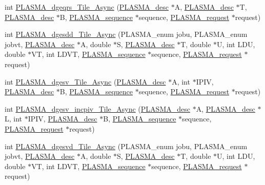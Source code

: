 \begin{DoxyCompactItemize}
\item 
int \hyperlink{group__double__Tile__Async_gad81f46c405c0b4fed0067a2d7928847a_gad81f46c405c0b4fed0067a2d7928847a}{P\+L\+A\+S\+M\+A\+\_\+dgeqrs\+\_\+\+Tile\+\_\+\+Async} (\hyperlink{structplasma__desc__t}{P\+L\+A\+S\+M\+A\+\_\+desc} $\ast$A, \hyperlink{structplasma__desc__t}{P\+L\+A\+S\+M\+A\+\_\+desc} $\ast$T, \hyperlink{structplasma__desc__t}{P\+L\+A\+S\+M\+A\+\_\+desc} $\ast$B, \hyperlink{structplasma__sequence__t}{P\+L\+A\+S\+M\+A\+\_\+sequence} $\ast$sequence, \hyperlink{structplasma__request__t}{P\+L\+A\+S\+M\+A\+\_\+request} $\ast$request)
\item 
int \hyperlink{group__double__Tile__Async_ga2b337c099140ae747db7a7ca9a842550_ga2b337c099140ae747db7a7ca9a842550}{P\+L\+A\+S\+M\+A\+\_\+dgesdd\+\_\+\+Tile\+\_\+\+Async} (P\+L\+A\+S\+M\+A\+\_\+enum jobu, P\+L\+A\+S\+M\+A\+\_\+enum jobvt, \hyperlink{structplasma__desc__t}{P\+L\+A\+S\+M\+A\+\_\+desc} $\ast$A, double $\ast$S, \hyperlink{structplasma__desc__t}{P\+L\+A\+S\+M\+A\+\_\+desc} $\ast$T, double $\ast$U, int L\+D\+U, double $\ast$V\+T, int L\+D\+V\+T, \hyperlink{structplasma__sequence__t}{P\+L\+A\+S\+M\+A\+\_\+sequence} $\ast$sequence, \hyperlink{structplasma__request__t}{P\+L\+A\+S\+M\+A\+\_\+request} $\ast$request)
\item 
int \hyperlink{group__double__Tile__Async_ga1a8cc58569c097961b0838a5561479e7_ga1a8cc58569c097961b0838a5561479e7}{P\+L\+A\+S\+M\+A\+\_\+dgesv\+\_\+\+Tile\+\_\+\+Async} (\hyperlink{structplasma__desc__t}{P\+L\+A\+S\+M\+A\+\_\+desc} $\ast$A, int $\ast$I\+P\+I\+V, \hyperlink{structplasma__desc__t}{P\+L\+A\+S\+M\+A\+\_\+desc} $\ast$B, \hyperlink{structplasma__sequence__t}{P\+L\+A\+S\+M\+A\+\_\+sequence} $\ast$sequence, \hyperlink{structplasma__request__t}{P\+L\+A\+S\+M\+A\+\_\+request} $\ast$request)
\item 
int \hyperlink{group__double__Tile__Async_gad14274e2fbe60b63e20731970e7579e6_gad14274e2fbe60b63e20731970e7579e6}{P\+L\+A\+S\+M\+A\+\_\+dgesv\+\_\+incpiv\+\_\+\+Tile\+\_\+\+Async} (\hyperlink{structplasma__desc__t}{P\+L\+A\+S\+M\+A\+\_\+desc} $\ast$A, \hyperlink{structplasma__desc__t}{P\+L\+A\+S\+M\+A\+\_\+desc} $\ast$L, int $\ast$I\+P\+I\+V, \hyperlink{structplasma__desc__t}{P\+L\+A\+S\+M\+A\+\_\+desc} $\ast$B, \hyperlink{structplasma__sequence__t}{P\+L\+A\+S\+M\+A\+\_\+sequence} $\ast$sequence, \hyperlink{structplasma__request__t}{P\+L\+A\+S\+M\+A\+\_\+request} $\ast$request)
\item 
int \hyperlink{group__double__Tile__Async_ga3afa0af47fd5ef150b1603dcf02e7d53_ga3afa0af47fd5ef150b1603dcf02e7d53}{P\+L\+A\+S\+M\+A\+\_\+dgesvd\+\_\+\+Tile\+\_\+\+Async} (P\+L\+A\+S\+M\+A\+\_\+enum jobu, P\+L\+A\+S\+M\+A\+\_\+enum jobvt, \hyperlink{structplasma__desc__t}{P\+L\+A\+S\+M\+A\+\_\+desc} $\ast$A, double $\ast$S, \hyperlink{structplasma__desc__t}{P\+L\+A\+S\+M\+A\+\_\+desc} $\ast$T, double $\ast$U, int L\+D\+U, double $\ast$V\+T, int L\+D\+V\+T, \hyperlink{structplasma__sequence__t}{P\+L\+A\+S\+M\+A\+\_\+sequence} $\ast$sequence, \hyperlink{structplasma__request__t}{P\+L\+A\+S\+M\+A\+\_\+request} $\ast$request)

\end{DoxyCompactItemize}
